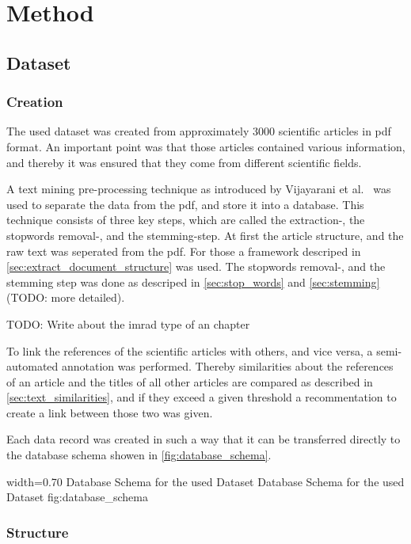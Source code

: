 \chapter{Method}
\label{cha:method}

\section{Dataset}
\label{sec:dataset}

\subsection{Creation}
The used dataset was created from approximately 3000 scientific articles in pdf format. An important point was that those articles contained various information, and thereby it was ensured that they come from different scientific fields.

A text mining pre-processing technique as introduced by Vijayarani et al.~\cite{Vijayarani2015} was used to separate the data from the pdf, and store it into a database.
This technique consists of three key steps, which are called the extraction-, the stopwords removal-, and the stemming-step. At first the article structure, and the raw text was seperated from the pdf. For those a framework descriped in \cref{sec:extract_document_structure} was used. The stopwords removal-, and the stemming step was done as descriped in \cref{sec:stop_words} and \cref{sec:stemming} (TODO: more detailed).

TODO: Write about the imrad type of an chapter

To link the references of the scientific articles with others, and vice versa, a semi-automated annotation was performed. Thereby similarities about the references of an article and the titles of all other articles are compared as described in \cref{sec:text_similarities}, and if they exceed a given threshold a recommentation to create a link between those two was given.

Each data record was created in such a way that it can be transferred directly to the database schema showen in \cref{fig:database_schema}.

      {width=0.70\textwidth}
      {Database Schema for the used Dataset}
      {Database Schema for the used Dataset}
      {fig:database_schema}

\subsection{Structure}
\label{sec:structure}

